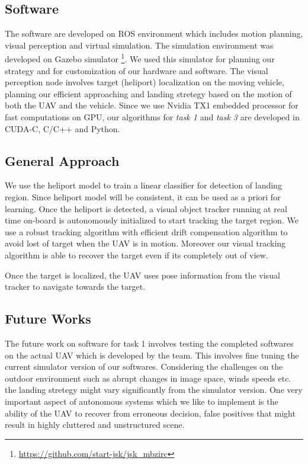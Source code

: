 \documentclass{standalone}
\begin{document}
\subsection{Software}

The software are developed on ROS environment which includes motion planning, visual perception and virtual simulation. The simulation environment was developed on Gazebo simulator \footnote{\url{https://github.com/start-jsk/jsk_mbzirc}}. We used this simulator for planning our strategy and for customization of our hardware and software. The visual perception node involves target (heliport) localization on the moving vehicle, planning our efficient approaching and landing stretegy based on the motion of both the UAV and the vehicle. Since we use Nvidia TX1 embedded processor for fast computations on GPU, our algorithms for \textit{task 1} and \textit{task 3} are developed in CUDA-C, C/C++ and Python. 



\subsection{General Approach}

We use the heliport model to train a linear classifier for detection of landing region. Since heliport model will be consistent, it can be used as a priori for learning. Once the heliport is detected, a visual object tracker running at real time on-board is autonomously initialized to start tracking the target region. We use a robust tracking algorithm with efficient drift compensation algorithm to avoid lost of target when the UAV is in motion. Moreover our visual tracking algorithm is able to recover the target even if its completely out of view. 

Once the target is localized, the UAV uses pose information from the visual tracker to navigate towards the target. 



\subsection{Future Works}
The future work on software for task 1 involves testing the completed softwares on the actual UAV which is developed by the team. This involves fine tuning the current simulator version of our softwares. Considering the challenges on the outdoor environment such as abrupt changes in image space, winds speeds etc. the landing stretegy might vary significantly from the simulator version. One very important aspect of autonomous systems which we like to implement is the ability of the UAV to recover from erroneous decision, false positives that might result in highly cluttered and unstructured scene.

\end{document}
